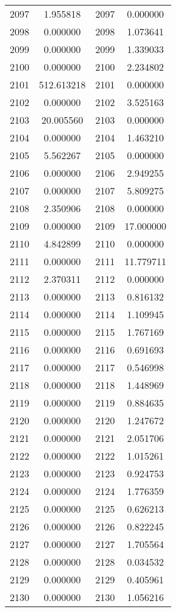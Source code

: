 \documentclass[12pt]{article}
\begin{document}
\begin{longtable}{@{}cccc@{}}
2097 & 1.955818 & 2097 & 0.000000 \\
2098 & 0.000000 & 2098 & 1.073641 \\
2099 & 0.000000 & 2099 & 1.339033 \\
2100 & 0.000000 & 2100 & 2.234802 \\
2101 & 512.613218 & 2101 & 0.000000 \\
2102 & 0.000000 & 2102 & 3.525163 \\
2103 & 20.005560 & 2103 & 0.000000 \\
2104 & 0.000000 & 2104 & 1.463210 \\
2105 & 5.562267 & 2105 & 0.000000 \\
2106 & 0.000000 & 2106 & 2.949255 \\
2107 & 0.000000 & 2107 & 5.809275 \\
2108 & 2.350906 & 2108 & 0.000000 \\
2109 & 0.000000 & 2109 & 17.000000 \\
2110 & 4.842899 & 2110 & 0.000000 \\
2111 & 0.000000 & 2111 & 11.779711 \\
2112 & 2.370311 & 2112 & 0.000000 \\
2113 & 0.000000 & 2113 & 0.816132 \\
2114 & 0.000000 & 2114 & 1.109945 \\
2115 & 0.000000 & 2115 & 1.767169 \\
2116 & 0.000000 & 2116 & 0.691693 \\
2117 & 0.000000 & 2117 & 0.546998 \\
2118 & 0.000000 & 2118 & 1.448969 \\
2119 & 0.000000 & 2119 & 0.884635 \\
2120 & 0.000000 & 2120 & 1.247672 \\
2121 & 0.000000 & 2121 & 2.051706 \\
2122 & 0.000000 & 2122 & 1.015261 \\
2123 & 0.000000 & 2123 & 0.924753 \\
2124 & 0.000000 & 2124 & 1.776359 \\
2125 & 0.000000 & 2125 & 0.626213 \\
2126 & 0.000000 & 2126 & 0.822245 \\
2127 & 0.000000 & 2127 & 1.705564 \\
2128 & 0.000000 & 2128 & 0.034532 \\
2129 & 0.000000 & 2129 & 0.405961 \\
2130 & 0.000000 & 2130 & 1.056216 \\

\end{longtable}
\end{document}
